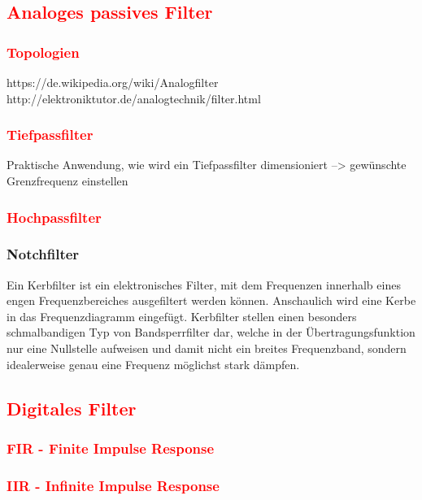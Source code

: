 		\subsection{\textcolor{red}{Analoges passives Filter}}
			\subsubsection{\textcolor{red}{Topologien}}
			https://de.wikipedia.org/wiki/Analogfilter\\
			http://elektroniktutor.de/analogtechnik/filter.html
			\subsubsection{\textcolor{red}{Tiefpassfilter}}
				Praktische Anwendung, wie wird ein Tiefpassfilter dimensioniert --> gewünschte Grenzfrequenz einstellen
			\subsubsection{\textcolor{red}{Hochpassfilter}}
			\subsubsection{Notchfilter}
				Ein Kerbfilter ist ein elektronisches Filter, mit dem Frequenzen innerhalb eines engen Frequenzbereiches ausgefiltert werden können. Anschaulich wird eine Kerbe in das Frequenzdiagramm eingefügt.
				Kerbfilter stellen einen besonders schmalbandigen Typ von Bandsperrfilter dar, welche in der Übertragungsfunktion nur eine Nullstelle aufweisen und damit nicht ein breites Frequenzband, sondern idealerweise genau eine Frequenz möglichst stark dämpfen.
				
		\subsection{\textcolor{red}{Digitales Filter}}
			\subsubsection{\textcolor{red}{FIR - Finite Impulse Response}}
			\subsubsection{\textcolor{red}{IIR - Infinite Impulse Response}	}		

